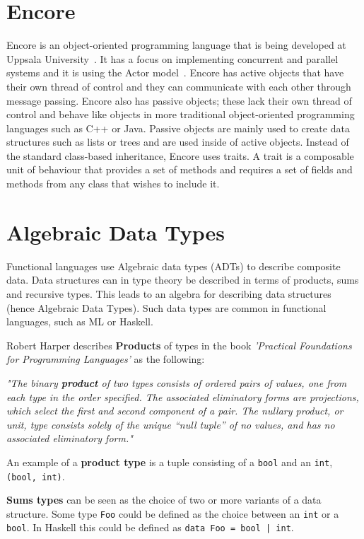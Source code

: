 \documentclass[10pt]{report}
\def\code#1{\texttt{#1}} %
\begin{document}
%
\label{ch:background}
%

\section{Encore}
\par{Encore is an object-oriented programming language that is being developed at Uppsala University~\cite{DBLP:conf/sfm/BrandauerCCFJPT15}. It has a focus on implementing concurrent and parallel systems and it is using the Actor model~\cite{Boer:2017:SAO:3145473.3122848}. Encore has active objects that have their own thread of control and they can communicate with each other through message passing. Encore also has passive objects; these lack their own thread of control and behave like objects in more traditional object-oriented programming languages such as C++ or Java. Passive objects are mainly used to create data structures such as lists or trees and are used inside of active objects. Instead of the standard class-based inheritance, Encore uses traits.  A trait is a composable unit of behaviour that provides a set of methods and requires a set of fields and methods from any class that wishes to include it.} %
\section{Algebraic Data Types}
\par{Functional languages use Algebraic data types (ADTs) to describe composite data. Data structures can in type theory be described in terms of products, sums and recursive types. This leads to an algebra for describing data structures (hence Algebraic Data Types). Such data types are common in functional languages, such as ML or Haskell.}

\par{Robert Harper describes \textbf{Products} of types in the book \textit{'Practical Foundations for Programming Languages'} as the following:}

\par{\textit{"The binary \textbf{product} of two types consists of ordered pairs of values, one from each type in the order specified. The associated eliminatory forms are projections, which select the first and second component of a pair. The nullary product, or unit, type consists solely of the unique “null tuple” of no values, and has no associated eliminatory form."}}
\par{An example of a \textbf{product type} is a tuple consisting of a \code{bool} and an \code{int}, \code{(bool, int)}.}
\par{\textbf{Sums types} can be seen as the choice of two or more variants of a data structure. Some type \code{Foo} could be defined as the choice between an \code{int} or a \code{bool}. In Haskell this could be defined as \code{data Foo = bool | int}.}
\end{document}
